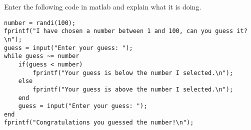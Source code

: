  
 

\begin{ex}
Enter the following code in matlab and explain what it is doing.
\begin{lstlisting}
number = randi(100);
fprintf("I have chosen a number between 1 and 100, can you guess it?\n");
guess = input("Enter your guess: ");
while guess ~= number
    if(guess < number)
        fprintf("Your guess is below the number I selected.\n");
    else
        fprintf("Your guess is above the number I selected.\n");
    end
    guess = input("Enter your guess: ");
end
fprintf("Congratulations you guessed the number!\n");
\end{lstlisting}
\end{ex}
 
 
 

 